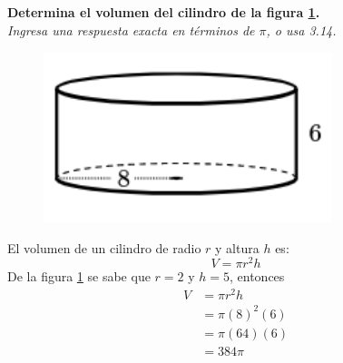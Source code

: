 \question[10] \textbf{Determina el volumen del cilindro de la figura \ref{fig:vol_cil_04}.}\\
\textit{Ingresa una respuesta exacta en términos de $\pi$, o usa 3.14.}

\begin{minipage}{0.3\linewidth}
    \begin{figure}[H]
        \begin{center}
            \includegraphics[width=0.75\textwidth]{../images/vol_cil_04.png}
        \end{center}
        \caption{}
        \label{fig:vol_cil_04}
    \end{figure}
\end{minipage}
\begin{minipage}{0.7\linewidth}
    \begin{solutionbox}{6cm}        El volumen de un cilindro de radio $r$ y altura $h$ es:
        \begin{equation*}
            V = \pi r^2 h
        \end{equation*}
        De la figura \ref{fig:vol_cil_04} se sabe que $r=2$ y $h=5$, entonces
        \begin{equation*}
            \begin{split}
                V & = \pi r^2 h\\
                & = \pi (8)^2 (6)\\
                & = \pi (64) (6)\\
                & = 384\pi
            \end{split}
        \end{equation*}
    \end{solutionbox}
\end{minipage}